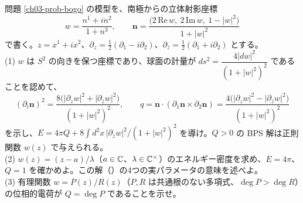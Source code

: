 \begin{problem}[難易度 C]\label{ch03-prob-lump}
問題 \ref{ch03-prob-bogo} の模型を、南極からの立体射影座標
\[
w=\frac{n^1+in^2}{1+n^3},\qquad\bm n=\frac{\bigl(2\,\mathrm{Re}\,w,\ 2\,\mathrm{Im}\,w,\ 1-\lvert w\rvert^2\bigr)}{1+\lvert w\rvert^2}
\]
で書く。$z=x^1+ix^2$、$\partial_z=\frac12(\partial_1-i\partial_2)$、$\partial_{\bar z}=\frac12(\partial_1+i\partial_2)$ とする。\\
(1) $w$ は $S^2$ の向きを保つ座標であり、球面の計量が $ds^2=\dfrac{4\lvert dw\rvert^2}{(1+\lvert w\rvert^2)^2}$ であることを認めて、
\[
(\partial_i\bm n)^2=\frac{8\bigl(\lvert\partial_zw\rvert^2+\lvert\partial_{\bar z}w\rvert^2\bigr)}{(1+\lvert w\rvert^2)^2},\qquad q=\bm n\cdot(\partial_1\bm n\times\partial_2\bm n)=\frac{4\bigl(\lvert\partial_zw\rvert^2-\lvert\partial_{\bar z}w\rvert^2\bigr)}{(1+\lvert w\rvert^2)^2}
\]
を示し、$E=4\pi Q+8\int d^2x\,\lvert\partial_{\bar z}w\rvert^2/(1+\lvert w\rvert^2)^2$ を導け。$Q>0$ の BPS 解は正則関数 $w(z)$ で与えられる。\\
(2) $w(z)=(z-a)/\lambda$（$a\in\mathbb{C}$、$\lambda\in\mathbb{C}^\times$）のエネルギー密度を求め、$E=4\pi$、$Q=1$ を確かめよ。この解（）の4つの実パラメータの意味を述べよ。\\
(3) 有理関数 $w=P(z)/R(z)$（$P,R$ は共通根のない多項式、$\deg P>\deg R$）の位相的電荷が $Q=\deg P$ であることを示せ。
\end{problem}

